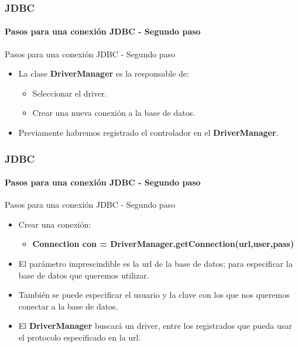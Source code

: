 \documentclass{beamer}
\begin{document}
	\begin{frame}
		\frametitle{JDBC}
		\framesubtitle{Pasos para una conexi\'on JDBC - Segundo paso}

        \begin{exampleblock}{Pasos para una conexi\'on JDBC - Segundo paso}
		    \begin{itemize}
		        \item La clase \textbf{DriverManager} es la responsable de:
		        \begin{itemize}
		            \item Seleccionar el driver.
		            \item Crear una nueva conexi\'on a la base de datos.
		        \end{itemize}
		        \item Previamente habremos registrado el controlador en el \textbf{DriverManager}.
		    \end{itemize}
		    \end{exampleblock}
	\end{frame}
	
	\begin{frame}
		\frametitle{JDBC}
		\framesubtitle{Pasos para una conexi\'on JDBC - Segundo paso}

        \begin{exampleblock}{Pasos para una conexi\'on JDBC - Segundo paso}
		    \begin{itemize}
		        \item Crear una conexi\'on:
		        \begin{itemize}
		            \item \textbf{Connection con = DriverManager.getConnection(url,user,pass)}
		        \end{itemize}
		        \item El par\'ametro imprescindible es la url de la base de datos; para especificar la base de datos que queremos utilizar.
		        \item Tambi\'en se puede especificar el usuario y la clave con los que nos queremos conectar a la base de datos.
		        \item El \textbf{DriverManager} buscar\'a un driver, entre los registrados que pueda usar el protocolo especificado en la url.
		    \end{itemize}
		    \end{exampleblock}
	\end{frame}	
	
\end{document}
